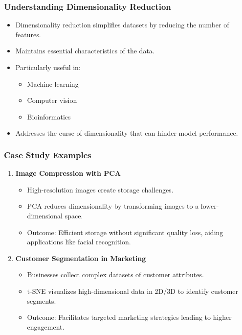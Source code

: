 \documentclass[aspectratio=169]{beamer}
\begin{document}
\begin{frame}[fragile]
    \frametitle{Understanding Dimensionality Reduction}
    \begin{itemize}
        \item Dimensionality reduction simplifies datasets by reducing the number of features.
        \item Maintains essential characteristics of the data.
        \item Particularly useful in:
        \begin{itemize}
            \item Machine learning
            \item Computer vision
            \item Bioinformatics
        \end{itemize}
        \item Addresses the curse of dimensionality that can hinder model performance.
    \end{itemize}
\end{frame}

\begin{frame}[fragile]
    \frametitle{Case Study Examples}
    \begin{enumerate}
        \item \textbf{Image Compression with PCA}
            \begin{itemize}
                \item High-resolution images create storage challenges.
                \item PCA reduces dimensionality by transforming images to a lower-dimensional space.
                \item Outcome: Efficient storage without significant quality loss, aiding applications like facial recognition.
            \end{itemize}
        \item \textbf{Customer Segmentation in Marketing}
            \begin{itemize}
                \item Businesses collect complex datasets of customer attributes.
                \item t-SNE visualizes high-dimensional data in 2D/3D to identify customer segments.
                \item Outcome: Facilitates targeted marketing strategies leading to higher engagement.
            \end{itemize}
    \end{enumerate}
\end{frame}
\end{document}

